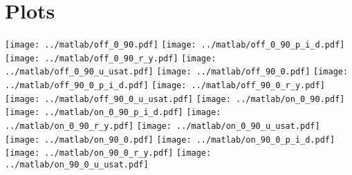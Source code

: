\documentclass[a4,paper,fleqn]{article}
\begin{document}
\section{Plots}
\clearpage
\texttt{[image: ../matlab/off\_0\_90.pdf]}
\clearpage
\texttt{[image: ../matlab/off\_0\_90\_p\_i\_d.pdf]}
\clearpage
\texttt{[image: ../matlab/off\_0\_90\_r\_y.pdf]}
\clearpage
\texttt{[image: ../matlab/off\_0\_90\_u\_usat.pdf]}
\clearpage
\texttt{[image: ../matlab/off\_90\_0.pdf]}
\clearpage
\texttt{[image: ../matlab/off\_90\_0\_p\_i\_d.pdf]}
\clearpage
\texttt{[image: ../matlab/off\_90\_0\_r\_y.pdf]}
\clearpage
\texttt{[image: ../matlab/off\_90\_0\_u\_usat.pdf]}
\clearpage
\texttt{[image: ../matlab/on\_0\_90.pdf]}
\clearpage
\texttt{[image: ../matlab/on\_0\_90\_p\_i\_d.pdf]}
\clearpage
\texttt{[image: ../matlab/on\_0\_90\_r\_y.pdf]}
\clearpage
\texttt{[image: ../matlab/on\_0\_90\_u\_usat.pdf]}
\clearpage
\texttt{[image: ../matlab/on\_90\_0.pdf]}
\clearpage
\texttt{[image: ../matlab/on\_90\_0\_p\_i\_d.pdf]}
\clearpage
\texttt{[image: ../matlab/on\_90\_0\_r\_y.pdf]}
\clearpage
\texttt{[image: ../matlab/on\_90\_0\_u\_usat.pdf]}
\end{document}
